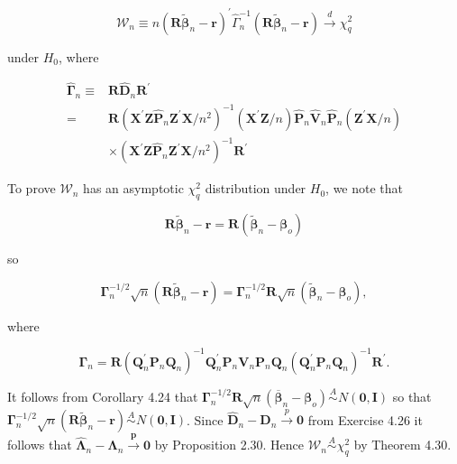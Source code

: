 \documentclass[10pt]{article}
\begin{document}
$$
\mathcal{W}_{n} \equiv n\left(\mathbf{R} \tilde{\boldsymbol{\beta}}_{n}-\mathbf{r}\right)^{\prime} \hat{\Gamma}_{n}^{-1}\left(\mathbf{R} \tilde{\boldsymbol{\beta}}_{n}-\mathbf{r}\right) \xrightarrow{d} \chi_{q}^{2}
$$

under $H_{0}$, where

$$
\begin{aligned}
\hat{\boldsymbol{\Gamma}}_{n} \equiv & \mathbf{R} \hat{\mathbf{D}}_{n} \mathbf{R}^{\prime} \\
= & \mathbf{R}\left(\mathbf{X}^{\prime} \mathbf{Z} \hat{\mathbf{P}}_{n} \mathbf{Z}^{\prime} \mathbf{X} / n^{2}\right)^{-1}\left(\mathbf{X}^{\prime} \mathbf{Z} / n\right) \hat{\mathbf{P}}_{n} \hat{\mathbf{V}}_{n} \hat{\mathbf{P}}_{n}\left(\mathbf{Z}^{\prime} \mathbf{X} / n\right) \\
& \times\left(\mathbf{X}^{\prime} \mathbf{Z} \hat{\mathbf{P}}_{n} \mathbf{Z}^{\prime} \mathbf{X} / n^{2}\right)^{-1} \mathbf{R}^{\prime}
\end{aligned}
$$

To prove $\mathcal{W}_{n}$ has an asymptotic $\chi_{q}^{2}$ distribution under $H_{0}$, we note that

$$
\mathbf{R} \tilde{\boldsymbol{\beta}}_{n}-\mathbf{r}=\mathbf{R}\left(\tilde{\boldsymbol{\beta}}_{n}-\boldsymbol{\beta}_{o}\right)
$$

so

$$
\boldsymbol{\Gamma}_{n}^{-1 / 2} \sqrt{n}\left(\mathbf{R} \tilde{\boldsymbol{\beta}}_{n}-\mathbf{r}\right)=\boldsymbol{\Gamma}_{n}^{-1 / 2} \mathbf{R} \sqrt{n}\left(\tilde{\boldsymbol{\beta}}_{n}-\boldsymbol{\beta}_{o}\right),
$$

where

$$
\boldsymbol{\Gamma}_{n}=\mathbf{R}\left(\mathbf{Q}_{n}^{\prime} \mathbf{P}_{n} \mathbf{Q}_{n}\right)^{-1} \mathbf{Q}_{n}^{\prime} \mathbf{P}_{n} \mathbf{V}_{n} \mathbf{P}_{n} \mathbf{Q}_{n}\left(\mathbf{Q}_{n}^{\prime} \mathbf{P}_{n} \mathbf{Q}_{n}\right)^{-1} \mathbf{R}^{\prime} .
$$

It follows from Corollary 4.24 that $\boldsymbol{\Gamma}_{n}^{-1 / 2} \mathbf{R} \sqrt{n}\left(\overline{\boldsymbol{\beta}}_{n}-\boldsymbol{\beta}_{o}\right) \stackrel{A}{\sim} N(\mathbf{0}, \mathbf{I})$ so that $\boldsymbol{\Gamma}_{n}^{-1 / 2} \sqrt{n}\left(\mathbf{R} \tilde{\boldsymbol{\beta}}_{n}-\mathbf{r}\right) \stackrel{A}{\sim} N(\mathbf{0}, \mathbf{I})$. Since $\hat{\mathbf{D}}_{n}-\mathbf{D}_{n} \xrightarrow{p} \mathbf{0}$ from Exercise 4.26 it follows that $\hat{\boldsymbol{\Lambda}}_{n}-\boldsymbol{\Lambda}_{n} \xrightarrow{\boldsymbol{p}} \mathbf{0}$ by Proposition 2.30. Hence $\mathcal{W}_{n} \stackrel{A}{\sim} \chi_{q}^{2}$ by Theorem 4.30.
\end{document}
